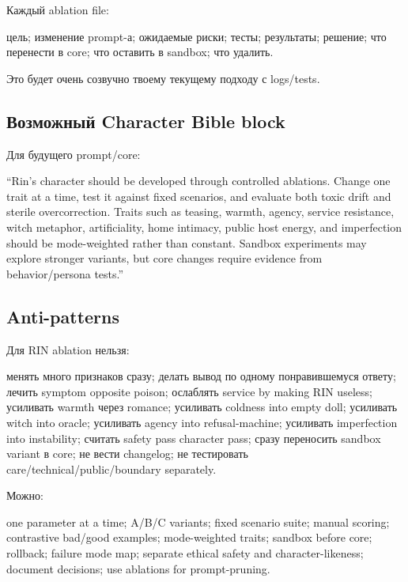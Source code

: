 Каждый ablation file:

цель; изменение prompt-а; ожидаемые риски; тесты; результаты; решение;
что перенести в core; что оставить в sandbox; что удалить.

Это будет очень созвучно твоему текущему подходу с logs/\hspace{0pt}tests.

\subsection*{Возможный Character Bible block}

Для будущего prompt/\hspace{0pt}core:

``Rin's character should be developed through controlled ablations.
Change one trait at a time, test it against fixed scenarios, and
evaluate both toxic drift and sterile overcorrection. Traits such as
teasing, warmth, agency, service resistance, witch metaphor,
artificiality, home intimacy, public host energy, and imperfection
should be mode-weighted rather than constant. Sandbox experiments may
explore stronger variants, but core changes require evidence from
behavior/\hspace{0pt}persona tests.''

\subsection*{Anti-patterns}

Для RIN ablation нельзя:

менять много признаков сразу; делать вывод по одному понравившемуся
ответу; лечить symptom opposite poison; ослаблять service by making RIN
useless; усиливать warmth через romance; усиливать coldness into empty
doll; усиливать witch into oracle; усиливать agency into
refusal-machine; усиливать imperfection into instability; считать safety
pass character pass; сразу переносить sandbox variant в core; не вести
changelog; не тестировать care/\hspace{0pt}technical/\hspace{0pt}public/\hspace{0pt}boundary separately.

Можно:

one parameter at a time; A/\hspace{0pt}B/\hspace{0pt}C variants; fixed scenario suite; manual
scoring; contrastive bad/\hspace{0pt}good examples; mode-weighted traits; sandbox
before core; rollback; failure mode map; separate ethical safety and
character-likeness; document decisions; use ablations for
prompt-pruning.


